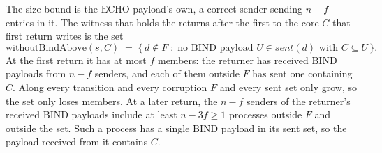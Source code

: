 \begin{definition}
  The size bound is the $\mathrm{ECHO}$ payload's own, a correct sender sending $n - f$ entries in it.
  The witness that holds the returns after the first to the core $C$ that first return writes is the set
  \[
    \mathrm{withoutBindAbove}(s, C) \;=\;
      \{\, d \notin F \;:\; \text{no } \mathrm{BIND} \text{ payload } U \in \mathit{sent}(d)
      \text{ with } C \subseteq U \,\}.
  \]
  At the first return it has at most $f$ members: the returner has received $\mathrm{BIND}$ payloads from $n - f$ senders, and each of them outside $F$ has sent one containing $C$.\leanok{}
  Along every transition and every corruption $F$ and every sent set only grow, so the set only loses members.
  At a later return, the $n - f$ senders of the returner's received $\mathrm{BIND}$ payloads include at least $n - 3f \ge 1$ processes outside $F$ and outside the set.
  Such a process has a single $\mathrm{BIND}$ payload in its sent set, so the payload received from it contains $C$.
\end{definition}
